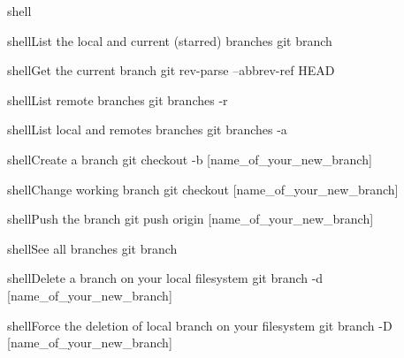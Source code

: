 \documentclass[10pt,a4paper]{article}
\begin{document}
\begin{multicols}{3}
\begin{codebox}{shell}{}
\end{codebox}

\begin{codebox}{shell}{List the local and current (starred) branches}
git branch

\end{codebox}

\begin{codebox}{shell}{Get the current branch}
git rev-parse --abbrev-ref HEAD

\end{codebox}

\begin{codebox}{shell}{List remote branches}
git branches -r

\end{codebox}

\begin{codebox}{shell}{List local and remotes branches}
git branches -a

\end{codebox}

\begin{codebox}{shell}{Create a branch}
git checkout -b [name_of_your_new_branch]

\end{codebox}

\begin{codebox}{shell}{Change working branch}
git checkout [name_of_your_new_branch]

\end{codebox}

\begin{codebox}{shell}{Push the branch}
git push origin [name_of_your_new_branch]

\end{codebox}

\begin{codebox}{shell}{See all branches}
git branch

\end{codebox}

\begin{codebox}{shell}{Delete a branch on your local filesystem}
git branch -d [name_of_your_new_branch]

\end{codebox}

\begin{codebox}{shell}{Force the deletion of local branch on your filesystem}
git branch -D [name_of_your_new_branch]

\end{codebox}


\end{multicols}
\end{document}
